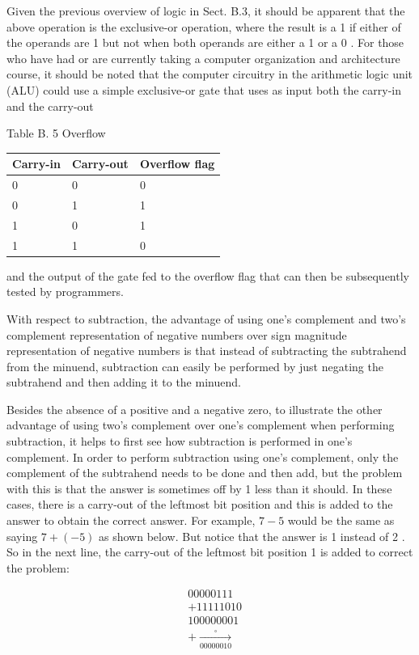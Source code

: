 \documentclass[10pt]{book}
\begin{document}
\begin{center}
\begin{center}
\begin{center}
\begin{center}
\begin{center}
Given the previous overview of logic in Sect. B.3, it should be apparent that the above operation is the exclusive-or operation, where the result is a 1 if either of the operands are 1 but not when both operands are either a 1 or a 0 . For those who have had or are currently taking a computer organization and architecture course, it should be noted that the computer circuitry in the arithmetic logic unit (ALU) could use a simple exclusive-or gate that uses as input both the carry-in and the carry-out

Table B. 5 Overflow

\begin{center}
\begin{tabular}{|l|l|l|}
\hline
Carry-in & Carry-out & Overflow flag \\
\hline
0 & 0 & 0 \\
\hline
0 & 1 & 1 \\
\hline
1 & 0 & 1 \\
\hline
1 & 1 & 0 \\
\hline
\end{tabular}
\end{center}

and the output of the gate fed to the overflow flag that can then be subsequently tested by programmers.

With respect to subtraction, the advantage of using one's complement and two's complement representation of negative numbers over sign magnitude representation of negative numbers is that instead of subtracting the subtrahend from the minuend, subtraction can easily be performed by just negating the subtrahend and then adding it to the minuend.

Besides the absence of a positive and a negative zero, to illustrate the other advantage of using two's complement over one's complement when performing subtraction, it helps to first see how subtraction is performed in one's complement. In order to perform subtraction using one's complement, only the complement of the subtrahend needs to be done and then add, but the problem with this is that the answer is sometimes off by 1 less than it should. In these cases, there is a carry-out of the leftmost bit position and this is added to the answer to obtain the correct answer. For example, $7-5$ would be the same as saying $7+(-5)$ as shown below. But notice that the answer is 1 instead of 2 . So in the next line, the carry-out of the leftmost bit position 1 is added to correct the problem:

$$
\begin{aligned}
& 00000111 \\
& +11111010 \\
& 100000001 \\
& +\xrightarrow[00000010]{\square}
\end{aligned}
$$


\end{center}
\end{center}
\end{center}
\end{center}
\end{center}
\end{document}
